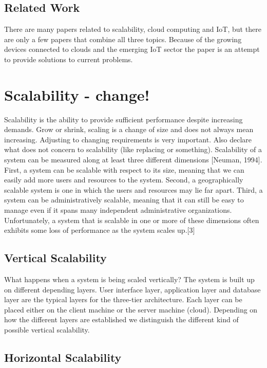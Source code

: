 \documentclass[sigconf]{acmart}
\begin{document}
\subsection{Related Work}
There are many papers related to scalability, cloud computing
and IoT, but there are only a few papers that combine all three
topics. Because of the growing devices connected to clouds
and the emerging IoT sector the paper is an attempt to provide
solutions to current problems.

\section{Scalability - change!}
Scalability is the ability to provide sufficient performance
despite increasing demands. Grow or shrink, scaling is a change
of size and does not always mean increasing. Adjusting to
changing requirements is very important. Also declare what
does not concern to scalability (like replacing or something).
Scalability of a system can be measured along at least three
different dimensions [Neuman, 1994]. First, a system can be
scalable with respect to its size, meaning that we can easily
add more users and resources to the system. Second, a
geographically scalable system is one in which the users
and resources may lie far apart. Third, a system can be
administratively scalable, meaning that it can still be easy to
manage even if it spans many independent administrative
organizations. Unfortunately, a system that is scalable in one
or more of these dimensions often exhibits some loss of
performance as the system scales up.[3]

\subsection{Vertical Scalability}

What happens when a system is being scaled vertically? The
system is built up on different depending layers. User interface
layer, application layer and database layer are the typical layers
for the three-tier architecture. Each layer can be placed either
on the client machine or the server machine (cloud). Depending
on how the different layers are established we distinguish the
different kind of possible vertical scalability.

\subsection{Horizontal Scalability}
\end{document}
